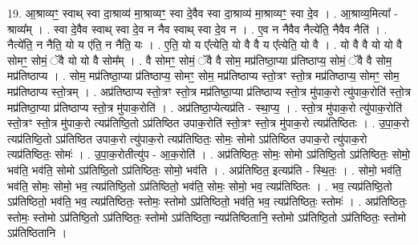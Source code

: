 \documentclass[17pt]{extarticle}
\begin{document}
19. आ॒श्राव्यꣳ॒॒ स्वाथ् स्वा दा॒श्राव्य॑ मा॒श्राव्यꣳ॒॒ स्वा दे॒वैव स्वा दा॒श्राव्य॑ मा॒श्राव्यꣳ॒॒ स्वा दे॒व । . आ॒श्राव्य॒मित्या᳚ - श्राव्य᳚म् । . स्वा दे॒वैव स्वाथ् स्वा दे॒व न नैव स्वाथ् स्वा दे॒व न । . ए॒व न नैवैव नैत्ये॑ति॒ नैवैव नैति॑ । . नैत्ये॑ति॒ न नैति॒ यो य ए॑ति॒ न नैति॒ यः । . ए॒ति॒ यो य ए᳚त्येति॒ यो वै वै य ए᳚त्येति॒ यो वै । . यो वै वै यो यो वै सोमꣳ॒॒ सोमं॒ ॅवै यो यो वै सोम᳚म् । . वै सोमꣳ॒॒ सोमं॒ ॅवै वै सोम॒ मप्र॑तिष्ठा॒प्या प्र॑तिष्ठाप्य॒ सोमं॒ ॅवै वै सोम॒ मप्र॑तिष्ठाप्य । . सोम॒ मप्र॑तिष्ठा॒प्या प्र॑तिष्ठाप्य॒ सोमꣳ॒॒ सोम॒ मप्र॑तिष्ठाप्य स्तो॒त्रꣳ स्तो॒त्र मप्र॑तिष्ठाप्य॒ सोमꣳ॒॒ सोम॒ मप्र॑तिष्ठाप्य स्तो॒त्रम् । . अप्र॑तिष्ठाप्य स्तो॒त्रꣳ स्तो॒त्र मप्र॑तिष्ठा॒प्या प्र॑तिष्ठाप्य स्तो॒त्र मु॑पाक॒रो त्यु॑पाक॒रोति॑ 
स्तो॒त्र मप्र॑तिष्ठा॒प्या प्र॑तिष्ठाप्य स्तो॒त्र मु॑पाक॒रोति॑ । . अप्र॑तिष्ठा॒प्येत्यप्र॑ति - स्था॒प्य॒ । . स्तो॒त्र मु॑पाक॒रो त्यु॑पाक॒रोति॑ स्तो॒त्रꣳ स्तो॒त्र मु॑पाक॒रो त्यप्र॑तिष्ठि॒तो ऽप्र॑तिष्ठित उपाक॒रोति॑ स्तो॒त्रꣳ 
स्तो॒त्र मु॑पाक॒रो त्यप्र॑तिष्ठितः । . उ॒पा॒क॒रो त्यप्र॑तिष्ठि॒तो ऽप्र॑तिष्ठित उपाक॒रो त्यु॑पाक॒रो त्यप्र॑तिष्ठितः॒ सोमः॒ सोमो ऽप्र॑तिष्ठित उपाक॒रो त्यु॑पाक॒रो त्यप्र॑तिष्ठितः॒ सोमः॑ । . उ॒पा॒क॒रोतीत्यु॑प - आ॒क॒रोति॑ । . अप्र॑तिष्ठितः॒ सोमः॒ सोमो ऽप्र॑तिष्ठि॒तो ऽप्र॑तिष्ठितः॒ सोमो॒ भव॑ति॒ भव॑ति॒ सोमो ऽप्र॑तिष्ठि॒तो ऽप्र॑तिष्ठितः॒ सोमो॒ भव॑ति । . अप्र॑तिष्ठित॒ इत्यप्र॑ति - स्थि॒तः॒ । . सोमो॒ भव॑ति॒ भव॑ति॒ सोमः॒ सोमो॒ भव॒ त्यप्र॑तिष्ठि॒तो ऽप्र॑तिष्ठितो॒ भव॑ति॒ सोमः॒ सोमो॒ भव॒ त्यप्र॑तिष्ठितः । . भव॒ त्यप्र॑तिष्ठि॒तो ऽप्र॑तिष्ठितो॒ भव॑ति॒ भव॒ त्यप्र॑तिष्ठितः॒ स्तोमः॒ स्तोमो ऽप्र॑तिष्ठितो॒ भव॑ति॒ भव॒ त्यप्र॑तिष्ठितः॒ स्तोमः॑ । . अप्र॑तिष्ठितः॒ स्तोमः॒ स्तोमो ऽप्र॑तिष्ठि॒तो ऽप्र॑तिष्ठितः॒ स्तोमो ऽप्र॑तिष्ठिता॒ न्यप्र॑तिष्ठितानि॒ स्तोमो ऽप्र॑तिष्ठि॒तो ऽप्र॑तिष्ठितः॒ स्तोमो ऽप्र॑तिष्ठितानि । \newline
\end{document}
